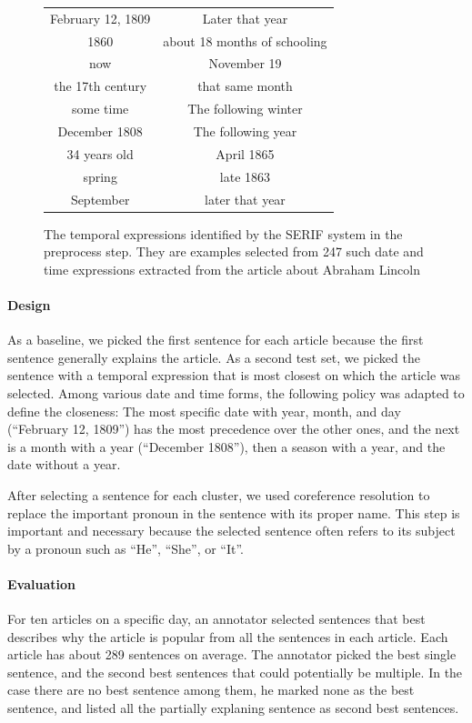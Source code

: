 \documentclass[11pt]{article}
\newcommand{\war}[1]{{\sf\small #1}}
\begin{document}
\begin{figure}
\centering
\begin{tabular}{|c|c|}
\hline
February 12, 1809 & Later that year \\
1860 & about 18 months of schooling \\
now & November 19 \\
the 17th century & that same month \\
some time & The following winter \\
December 1808 & The following year \\
34 years old & April 1865 \\
spring & late 1863 \\
September & later that year \\
\hline
\end{tabular}
\label{fig:temporal-expressions-examples}
\caption{The temporal expressions identified by the SERIF system in the preprocess step. They are examples selected from 247 such date and time expressions extracted from the article about \war{Abraham Lincoln}}
\end{figure}

\paragraph {Design}
As a baseline, we picked the first sentence for each article because the first sentence generally explains the article.
As a second test set, we picked the sentence with a temporal expression that is most closest on which the article was selected.
Among various date and time forms, the following policy was adapted to define the closeness:
The most specific date with year, month, and day (``February 12, 1809'') has the most precedence over the other ones, and the next is a month with a year (``December 1808''), then a season with a year, and the date without a year.

After selecting a sentence for each cluster, we used coreference resolution to replace the important pronoun in the sentence with its proper name.
This step is important and necessary because the selected sentence often refers to its subject by a pronoun such as ``He'', ``She'', or ``It''.

\paragraph {Evaluation}
For ten articles on a specific day, an annotator selected sentences that best describes why the article is popular from all the sentences in each article.
Each article has about 289 sentences on average.
The annotator picked the best single sentence, and the second best sentences that could potentially be multiple.
In the case there are no best sentence among them, he marked none as the best sentence, and listed all the partially explaning sentence as second best sentences.
\end{document}
